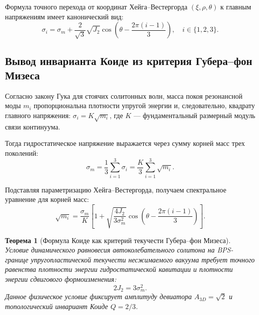 \documentclass[12pt,a4paper]{article}
\newtheorem{theorem}{Теорема}
\begin{document}
	Формула точного перехода от координат Хейга--Вестергорда $(\xi, \rho, \theta)$ к главным напряжениям имеет канонический вид:
	\begin{equation}
		\sigma_i = \sigma_m + \frac{2}{\sqrt{3}} \sqrt{J_2} \cos\left( \theta - \frac{2\pi(i-1)}{3} \right), \quad i \in \{1, 2, 3\}.
	\end{equation}
	
	\subsection{Вывод инварианта Коиде из критерия Губера--фон Мизеса}
	Согласно закону Гука для стоячих солитонных волн, масса покоя резонансной моды $m_i$ пропорциональна плотности упругой энергии и, следовательно, квадрату главного напряжения: $\sigma_i = K \sqrt{m_i}$, где $K$ --- фундаментальный размерный модуль связи континуума.
	
	Тогда гидростатическое напряжение выражается через сумму корней масс трех поколений:
	\begin{equation}
		\sigma_m = \frac{1}{3} \sum_{i=1}^3 \sigma_i = \frac{K}{3} \sum_{i=1}^3 \sqrt{m_i}.
	\end{equation}
	
	Подставляя параметризацию Хейга--Вестергорда, получаем спектральное уравнение для корней масс:
	\begin{equation}
		\sqrt{m_i} = \frac{\sigma_m}{K} \left[ 1 + \sqrt{\frac{4 J_2}{3 \sigma_m^2}} \cos\left( \theta - \frac{2\pi(i-1)}{3} \right) \right].
	\end{equation}
	
	\begin{theorem}[Формула Коиде как критерий текучести Губера--фон Мизеса]
		Условие динамического равновесия автоколебательного солитона на BPS-границе упругопластической текучести несжимаемого вакуума требует точного равенства плотности энергии гидростатической кавитации и плотности энергии сдвигового формоизменения:
		\begin{equation}
			2 J_2 = 3 \sigma_m^2.
		\end{equation}
		Данное физическое условие фиксирует амплитуду девиатора $A_{3D} = \sqrt{2}$ и топологический инвариант Коиде $Q = 2/3$.
	\end{theorem}
	
\end{document}
